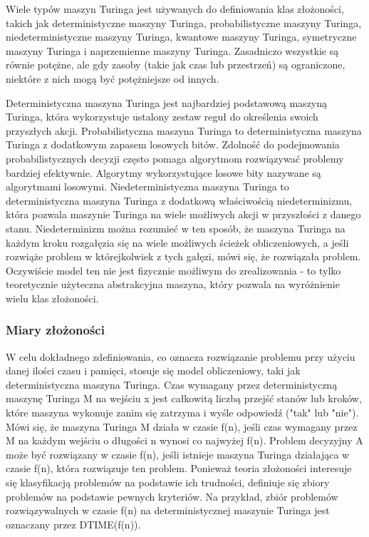 Wiele typów maszyn Turinga jest używanych do definiowania klas złożoności, takich jak deterministyczne maszyny Turinga, probabilistyczne maszyny Turinga, niedeterministyczne maszyny Turinga, kwantowe maszyny Turinga, symetryczne maszyny Turinga i naprzemienne maszyny Turinga. Zasadniczo wszystkie są równie potężne, ale gdy zasoby (takie jak czas lub przestrzeń) są ograniczone, niektóre z nich mogą być potężniejsze od innych.

Deterministyczna maszyna Turinga jest najbardziej podstawową maszyną Turinga, która wykorzystuje ustalony zestaw reguł do określenia swoich przyszłych akcji. Probabilistyczna maszyna Turinga to deterministyczna maszyna Turinga z dodatkowym zapasem losowych bitów. Zdolność do podejmowania probabilistycznych decyzji często pomaga algorytmom rozwiązywać problemy bardziej efektywnie. Algorytmy wykorzystujące losowe bity nazywane są algorytmami losowymi. Niedeterministyczna maszyna Turinga to deterministyczna maszyna Turinga z dodatkową właściwością niedeterminizmu, która pozwala maszynie Turinga na wiele możliwych akcji w przyszłości z danego stanu. Niedeterminizm można rozumieć w ten sposób, że maszyna Turinga na każdym kroku rozgałęzia się na wiele możliwych ścieżek obliczeniowych, a jeśli rozwiąże problem w którejkolwiek z tych gałęzi, mówi się, że rozwiązała problem. Oczywiście model ten nie jest fizycznie możliwym do zrealizowania - to tylko teoretycznie użyteczna abstrakcyjna maszyna, który pozwala na wyróżnienie wielu klas złożoności. 

\subsubsection{Miary złożoności}
W celu dokładnego zdefiniowania, co oznacza rozwiązanie problemu przy użyciu danej ilości czasu i pamięci, stosuje się model obliczeniowy, taki jak deterministyczna maszyna Turinga. Czas wymagany przez deterministyczną maszynę Turinga M na wejściu x jest całkowitą liczbą przejść stanów lub kroków, które maszyna wykonuje zanim się zatrzyma i wyśle odpowiedź ("tak" lub "nie"). Mówi się, że maszyna Turinga M działa w czasie f(n), jeśli czas wymagany przez M na każdym wejściu o długości n wynosi co najwyżej f(n). Problem decyzyjny A może być rozwiązany w czasie f(n), jeśli istnieje maszyna Turinga działająca w czasie f(n), która rozwiązuje ten problem. Ponieważ teoria złożoności interesuje się klasyfikacją problemów na podstawie ich trudności, definiuje się zbiory problemów na podstawie pewnych kryteriów. Na przykład, zbiór problemów rozwiązywalnych w czasie f(n) na deterministycznej maszynie Turinga jest oznaczany przez DTIME(f(n)).

